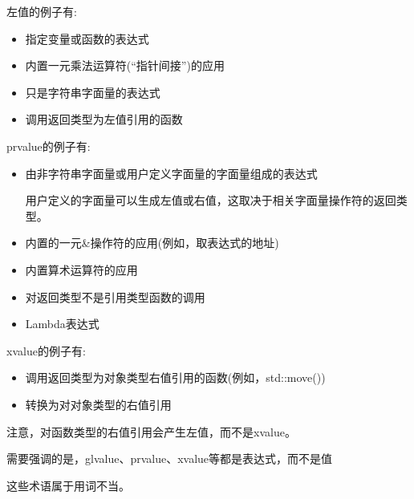 左值的例子有:

\begin{itemize}
\item 
指定变量或函数的表达式

\item 
内置一元乘法运算符(“指针间接”)的应用

\item 
只是字符串字面量的表达式

\item 
调用返回类型为左值引用的函数
\end{itemize}

prvalue的例子有:

\begin{itemize}
\item 
由非字符串字面量或用户定义字面量的字面量组成的表达式

\begin{tcolorbox}[colback=webgreen!5!white,colframe=webgreen!75!black]
\hspace*{0.75cm}用户定义的字面量可以生成左值或右值，这取决于相关字面量操作符的返回类型。
\end{tcolorbox}

\item 
内置的一元\&操作符的应用(例如，取表达式的地址)

\item 
内置算术运算符的应用

\item 
对返回类型不是引用类型函数的调用

\item 
Lambda表达式
\end{itemize}

xvalue的例子有:

\begin{itemize}
\item 
调用返回类型为对象类型右值引用的函数(例如，std::move())

\item 
转换为对对象类型的右值引用
\end{itemize}

注意，对函数类型的右值引用会产生左值，而不是xvalue。

需要强调的是，glvalue、prvalue、xvalue等都是表达式，而不是值

\begin{tcolorbox}[colback=webgreen!5!white,colframe=webgreen!75!black]
\hspace*{0.75cm}这些术语属于用词不当。
\end{tcolorbox}

